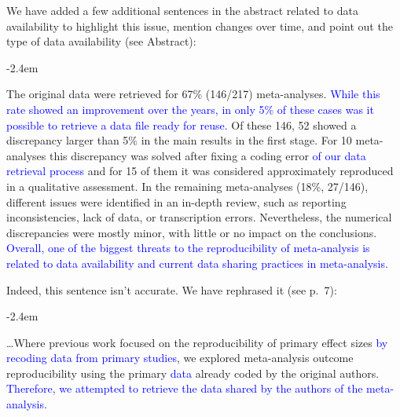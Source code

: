 \documentclass[draft]{article}
\renewenvironment{quote}{\begin{fquote}\advance\leftmargini -2.4em\begin{oldquote}}{\end{oldquote}\end{fquote}}
\newenvironment{fquote}
  {\def\FrameCommand{
	\fboxsep=0.6em %
	\fcolorbox{black}{white}}%
    \MakeFramed {\advance\hsize-2\width \FrameRestore}
    \begin{minipage}{\linewidth}
  }
  {\end{minipage}\endMakeFramed}
\begin{document}
We have added a few additional sentences in the abstract related to data availability to highlight this issue, mention changes over time, and point out the type of data availability (see Abstract):

\begin{quote}
The original data were retrieved for 67\% (146/217) meta-analyses. \textcolor{blue}{While this rate showed an improvement over the years, in only 5\% of these cases was it possible to retrieve a data file ready for reuse.} Of these 146, 52 showed a discrepancy larger than 5\% in the main results in the first stage. For 10 meta-analyses this discrepancy was solved after fixing a coding error \textcolor{blue}{of our data retrieval process} and for 15 of them it was considered approximately reproduced in a qualitative assessment. In the remaining meta-analyses (18\%, 27/146), different issues were identified in an in-depth review, such as reporting inconsistencies, lack of data, or transcription errors. Nevertheless, the numerical discrepancies were mostly minor, with little or no impact on the conclusions. \textcolor{blue}{Overall, one of the biggest threats to the reproducibility of meta-analysis is related to data availability and current data sharing practices in meta-analysis.}
\end{quote}


Indeed, this sentence isn't accurate. We have rephrased it (see p.~7):

\begin{quote}
\ldots Where previous work focused on the reproducibility of primary effect sizes \textcolor{blue}{by recoding data from primary studies}, we explored meta-analysis outcome reproducibility using the primary \textcolor{blue}{data} already coded by the original authors. \textcolor{blue}{Therefore, we attempted to retrieve the data shared by the authors of the meta-analysis.}
\end{quote}

\end{document}

